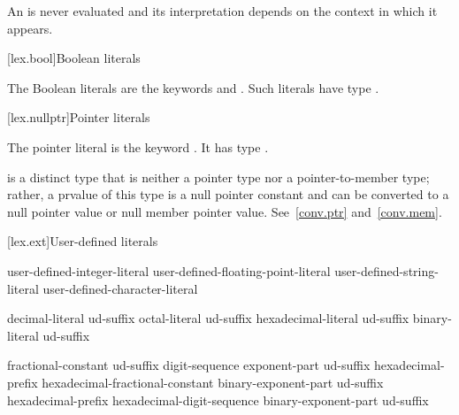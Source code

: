 \pnum
An  is never evaluated and
its interpretation depends on the context in which it appears.

[lex.bool]{Boolean literals}

%
\begin{bnf}
\br
    \br
\end{bnf}

\pnum
{}%
The Boolean literals are the keywords  and .
Such literals have type .

[lex.nullptr]{Pointer literals}

%
\begin{bnf}
\br
\end{bnf}

\pnum
The pointer literal is the keyword . It has type
.
\begin{note}
 is a distinct type that is neither a pointer type nor a pointer-to-member type;
rather, a prvalue of this type is a null pointer constant and can be
converted to a null pointer value or null member pointer value. See~\ref{conv.ptr}
and~\ref{conv.mem}.
\end{note}

[lex.ext]{User-defined literals}

%
\begin{bnf}
\br
    user-defined-integer-literal\br
    user-defined-floating-point-literal\br
    user-defined-string-literal\br
    user-defined-character-literal
\end{bnf}

\begin{bnf}
\br
    decimal-literal ud-suffix\br
    octal-literal ud-suffix\br
    hexadecimal-literal ud-suffix\br
    binary-literal ud-suffix
\end{bnf}

\begin{bnf}
\br
    fractional-constant  ud-suffix\br
    digit-sequence exponent-part ud-suffix\br
    hexadecimal-prefix hexadecimal-fractional-constant binary-exponent-part ud-suffix\br
    hexadecimal-prefix hexadecimal-digit-sequence binary-exponent-part ud-suffix
\end{bnf}


